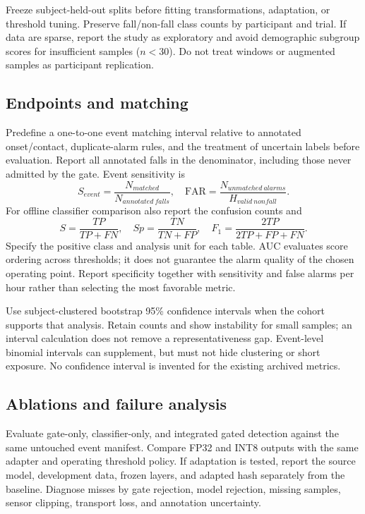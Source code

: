 Freeze subject-held-out splits before fitting transformations, adaptation, or threshold tuning. Preserve fall/non-fall class counts by participant and trial. If data are sparse, report the study as exploratory and avoid demographic subgroup scores for insufficient samples ($n<30$). Do not treat windows or augmented samples as participant replication.

\subsection{Endpoints and matching}
Predefine a one-to-one event matching interval relative to annotated onset/contact, duplicate-alarm rules, and the treatment of uncertain labels before evaluation. Report all annotated falls in the denominator, including those never admitted by the gate. Event sensitivity is
\[
 S_{event}=\frac{N_{matched}}{N_{annotated\ falls}},\quad
 \mathrm{FAR}=\frac{N_{unmatched\ alarms}}{H_{valid\ nonfall}}.
\]
For offline classifier comparison also report the confusion counts and
\[
 S=\frac{TP}{TP+FN},\quad Sp=\frac{TN}{TN+FP},\quad
 F_1=\frac{2TP}{2TP+FP+FN}.
\]
Specify the positive class and analysis unit for each table. AUC evaluates score ordering across thresholds; it does not guarantee the alarm quality of the chosen operating point. Report specificity together with sensitivity and false alarms per hour rather than selecting the most favorable metric.

Use subject-clustered bootstrap 95\% confidence intervals when the cohort supports that analysis. Retain counts and show instability for small samples; an interval calculation does not remove a representativeness gap. Event-level binomial intervals can supplement, but must not hide clustering or short exposure. No confidence interval is invented for the existing archived metrics.

\subsection{Ablations and failure analysis}
Evaluate gate-only, classifier-only, and integrated gated detection against the same untouched event manifest. Compare FP32 and INT8 outputs with the same adapter and operating threshold policy. If adaptation is tested, report the source model, development data, frozen layers, and adapted hash separately from the baseline. Diagnose misses by gate rejection, model rejection, missing samples, sensor clipping, transport loss, and annotation uncertainty.

